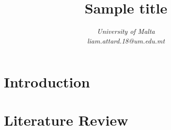 \documentclass[conference]{IEEEtran}
\title{Sample title}
\author{\IEEEauthorblockN{Liam Attard [0299300L] }
\IEEEauthorblockA{Department of Artificial Intelligence} 
\textit{University of Malta}\\
\textit{liam.attard.18@um.edu.mt}}
\begin{document}
  \maketitle

  \section{Introduction}
    

  \section{Literature Review}

  
  
\end{document}
